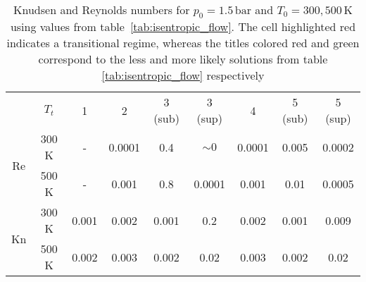 \begin{table}[H]
    \centering
    \begin{tabular}{|c|c|c|c|c|c|c|c|c|}
    \hline
    \multirow{2}{*}{} & \multirow{2}{*}{$T_t$}
    & \multirow{2}{*}{1} & \multirow{2}{*}{2} & \multirow{2}{*}{\color{greenColor} 3 (sub)}
    & \multirow{2}{*}{\color{redColor} 3 (sup)} & \multirow{2}{*}{4}
    & \multirow{2}{*}{\color{redColor} 5 (sub)} & \multirow{2}{*}{\color{greenColor}5 (sup)} \\
    & & & & & & & & \\ \hline

    \multirow{2}{*}{Re}
      & 300 K & - & 0.0001 & 0.4 & $\sim 0$ & 0.0001 & 0.005 & 0.0002 \\
      & 500 K & - & 0.001  & 0.8 & 0.0001   & 0.001  & 0.01  & 0.0005 \\ \hline

    \multirow{2}{*}{Kn}
      & 300 K & 0.001 & 0.002 & 0.001 & \cellcolor[HTML]{FFADA8}0.2
              & 0.002 & 0.001 & 0.009 \\
      & 500 K & 0.002 & 0.003 & 0.002 & 0.02
              & 0.003 & 0.002 & 0.02 \\ \hline
    \end{tabular}
    \caption{Knudsen and Reynolds numbers for $p_0 = 1.5\,\mathrm{bar}$ 
        and $T_0 = 300, 500\,\mathrm{K}$ using values from 
        table~\ref{tab:isentropic_flow}. The cell highlighted {\color{redColor}red} indicates 
        a transitional regime, whereas the titles colored {\color{redColor} red} and {\color{greenColor} green} correspond to the less and more likely solutions from table \ref{tab:isentropic_flow} respectively}
    \label{tab:test-knudsen-reynolds-isentropic}
\end{table}
